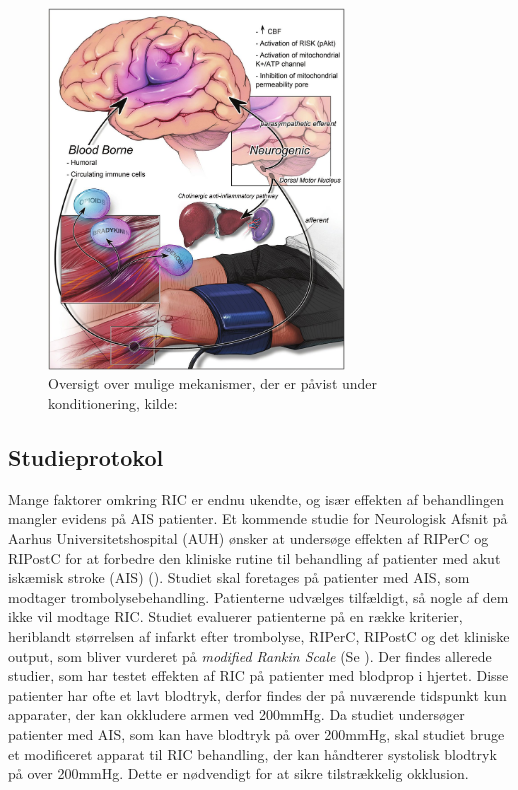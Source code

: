 \begin{figure}[H]
	\centering
	\includegraphics[width = 0.7\textwidth]{billeder/konditioneringsmekanismer.png}
	\caption{Oversigt over mulige mekanismer, der er påvist under konditionering, kilde: \cite{RefWorks:3}} \label{fig:mechanism}
\end{figure}

\subsection{Studieprotokol}\label{title:studieprotokold}
Mange faktorer omkring RIC er endnu ukendte, og især effekten af behandlingen mangler evidens på AIS patienter. Et kommende studie for Neurologisk Afsnit på Aarhus Universitetshospital (AUH) ønsker at undersøge effekten af RIPerC og RIPostC for at forbedre den kliniske rutine til behandling af patienter med akut iskæmisk stroke (AIS) (\cite{RefWorks:39}). Studiet skal foretages på patienter med AIS, som modtager trombolysebehandling. Patienterne udvælges tilfældigt, så nogle af dem ikke vil modtage RIC. Studiet evaluerer patienterne på en række kriterier, heriblandt størrelsen af infarkt efter trombolyse, RIPerC, RIPostC og det kliniske output, som bliver vurderet på \textit{modified Rankin Scale} (Se \cite{Manual:1}). Der findes allerede studier, som har testet effekten af RIC på patienter med blodprop i hjertet. Disse patienter har ofte et lavt blodtryk, derfor findes der på nuværende tidspunkt kun apparater, der kan okkludere armen ved 200mmHg. Da studiet undersøger patienter med AIS, som kan have blodtryk på over 200mmHg, skal studiet bruge et modificeret apparat til RIC behandling, der kan håndterer systolisk blodtryk på over 200mmHg. Dette er nødvendigt for at sikre tilstrækkelig okklusion.

